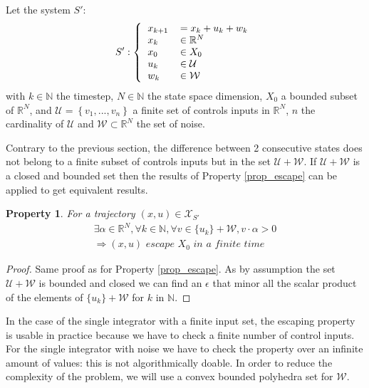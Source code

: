 \documentclass{article}
\newtheorem{property}{Property}
\theoremstyle{named}
\begin{document}
Let the system $S'$:
\begin{equation}
S':\left \{
  \begin{tabular}{ll}
  $x_{k+1}$ &$= x_k + u_k + w_k$\\
  $x_k$ & $\in \mathbb{R}^N$\\
  $x_0$ & $\in X_0$\\
  $u_k$ & $\in \mathcal{U}$\\
  $w_k$ & $\in \mathcal{W}$
  \end{tabular}
\right.
\end{equation}
with $k \in \mathbb{N}$ the timestep, $N \in \mathbb{N}$ the state space dimension, $X_0$ a bounded subset of $\mathbb{R}^N$, and $\mathcal{U} = \left \{v_1,...,v_n \right \}$ a finite set of controls inputs in $\mathbb{R}^N$, $n$ the cardinality of $\mathcal{U}$ and $\mathcal{W} \subset \mathbb{R}^N$ the set of noise.

Contrary to the previous section, the difference between 2 consecutive states does not belong to a finite subset of controls inputs but in the set $\mathcal{U} + \mathcal{W}$.
If $\mathcal{U} + \mathcal{W}$ is a closed and bounded set then the results of Property \ref{prop_escape} can be applied to get equivalent results.

\begin{property} \label{prop_escape_noise}
For a trajectory $(x,u) \in \mathcal{X}_{S'}$ 
\begin{equation}
\begin{split}
\exists \alpha \in \mathbb{R}^N,
\forall k \in \mathbb{N},
\forall v \in \{u_k\} + \mathcal{W}, v \cdot \alpha > 0 \\
\Rightarrow
(x,u) \textit{ escape } X_0 \textit{ in a finite time} 
\end{split}
\end{equation}
\end{property}

\begin{proof}
Same proof as for Property \ref{prop_escape}. As by assumption the set $\mathcal{U} + \mathcal{W}$ is bounded and closed we can find an $\epsilon$ that minor all the scalar product of the elements of $\{u_k\} + \mathcal{W}$ for $k$ in $\mathbb{N}$.
\end{proof}

In the case of the single integrator with a finite input set, the escaping property is usable in practice because we have to check a finite number of control inputs.
For the single integrator with noise we have to check the property over an infinite amount of values: this is not algorithmically doable.
In order to reduce the complexity of the problem, we will use a convex bounded polyhedra set for $\mathcal{W}$.
\end{document}
